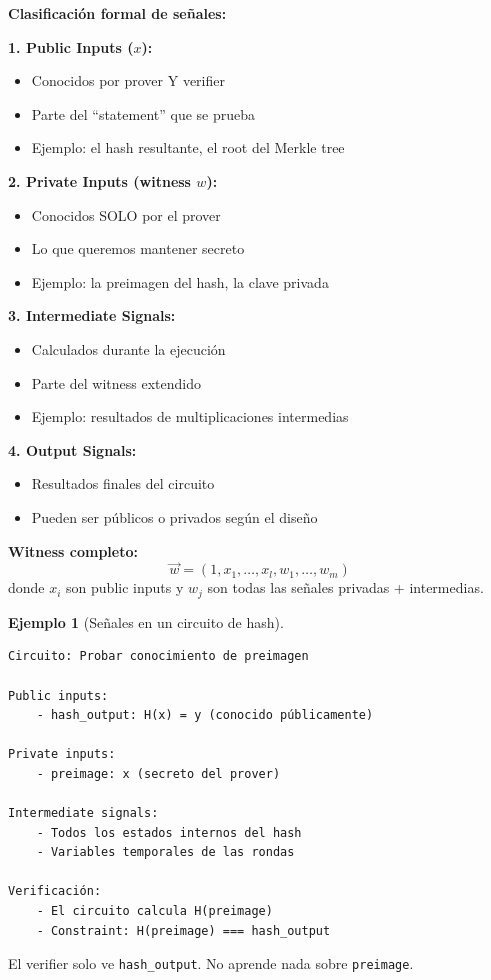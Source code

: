 \documentclass[11pt,a4paper,twoside,openright]{book}
\theoremstyle{definition}
\newtheorem{example}{Ejemplo}[chapter]
\theoremstyle{plain}
\theoremstyle{remark}
\begin{document}
\begin{mathnote}
\textbf{Clasificación formal de señales:}

\textbf{1. Public Inputs ($x$):}
\begin{itemize}
    \item Conocidos por prover Y verifier
    \item Parte del ``statement'' que se prueba
    \item Ejemplo: el hash resultante, el root del Merkle tree
\end{itemize}

\textbf{2. Private Inputs (witness $w$):}
\begin{itemize}
    \item Conocidos SOLO por el prover
    \item Lo que queremos mantener secreto
    \item Ejemplo: la preimagen del hash, la clave privada
\end{itemize}

\textbf{3. Intermediate Signals:}
\begin{itemize}
    \item Calculados durante la ejecución
    \item Parte del witness extendido
    \item Ejemplo: resultados de multiplicaciones intermedias
\end{itemize}

\textbf{4. Output Signals:}
\begin{itemize}
    \item Resultados finales del circuito
    \item Pueden ser públicos o privados según el diseño
\end{itemize}

\textbf{Witness completo:}
\[ \vec{w} = (1, x_1, \ldots, x_l, w_1, \ldots, w_m) \]
donde $x_i$ son public inputs y $w_j$ son todas las señales privadas + intermedias.
\end{mathnote}

\begin{example}[Señales en un circuito de hash]
\begin{verbatim}
Circuito: Probar conocimiento de preimagen

Public inputs:
    - hash_output: H(x) = y (conocido públicamente)

Private inputs:
    - preimage: x (secreto del prover)

Intermediate signals:
    - Todos los estados internos del hash
    - Variables temporales de las rondas
    
Verificación:
    - El circuito calcula H(preimage)
    - Constraint: H(preimage) === hash_output
\end{verbatim}

El verifier solo ve \texttt{hash\_output}. No aprende nada sobre \texttt{preimage}.
\end{example}
\end{document}
